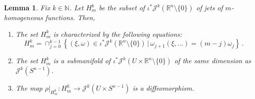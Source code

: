 \documentclass[10pt,twoside]{article}
\newcommand{\N}{\mathbb{N}}
\newcommand{\calJ}{\mathcal{J}}
\newcommand{\Rnzls}{\mathbb{R}^n\setminus\{0\}}
\numberwithin{theorem}{section}
\newtheorem{lemma}[theorem]{Lemma}
\begin{document}
\begin{lemma}\label{l.jets_of_homogeneous_functions}
Fix $k\in\N$. Let $H^k_m$ be the subset of $\iota^*\calJ^k\left(\Rnzls\right)$ of jets of $m$-homogeneous functions. Then,
\begin{enumerate}
\item The set $H^k_m$ is characterized by the following equations:
\[
H^k_m=\cap_{j=0}^{k-1}\left\{(\xi,\omega)\in\iota^*\calJ^k\left(\Rnzls\right)\, \Big |\, \omega_{j+1}(\xi,\dots)=(m-j)\omega_j\right\}\, .
\]
\item The set $H^k_m$ is a submanifold of $\iota^*\calJ^k\left(U\times\Rnzls\right)$ of the same dimension as $\calJ^k\left(S^{n-1}\right)$.
\item The map $\rho|_{H^k_m}:H^k_m\rightarrow\calJ^k\left(U\times S^{n-1}\right)$ is a diffeomorphism.
\end{enumerate}
\end{lemma}
\end{document}
